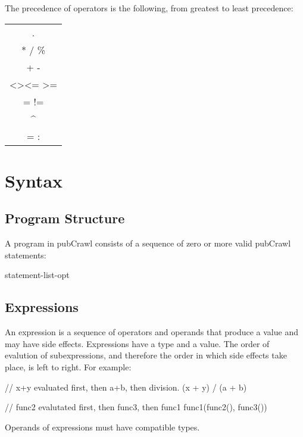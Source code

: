\documentclass[oneside]{book}
\begin{document}
The precedence of operators is the following, from greatest to least precedence:

\begin{center}
  \begin{tabular}{c}
  .\\
  * / \% \\
  + -\\
  \textless \textgreater \textless= \textgreater=\\
  = != \\
  \textasciicircum\\ 
  = :  \\
  \end{tabular}
\end{center}


\section{Syntax}
\subsection{Program Structure}

A program in pubCrawl consists of a sequence of zero or more valid pubCrawl statements:
\begin{code}
statement-list-opt
\end{code}

\subsection{Expressions}
An expression is a sequence of operators and operands that produce a value and may have side effects. Expressions have a type and a value. The order of evalution of subexpressions, and therefore the order in which side effects take place, is left to right. For example:

\begin{mdframed}
[hidealllines=true,backgroundcolor=gray!10,skipbelow=.5em,skipabove=.5em]
\begin{code}

// x+y evaluated first, then a+b, then division.
(x + y) / (a + b)

// func2 evalutated first, then func3, then func1
func1(func2(), func3())

\end{code}
\end{mdframed}
Operands of expressions must have compatible types.
\end{document}
